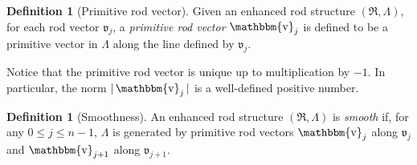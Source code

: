 \documentclass[a4paper,11pt]{amsart}
\theoremstyle{definition}
\newtheorem{definition}[theorem]{Definition}
\numberwithin{equation}{section}
\newcommand{\mv} {\mathfrak v}
\newcommand{\mR} {\mathfrak R}
\DeclareMathOperator{\bbv}{\mathbbm{v}}
\begin{document}
\begin{definition}[Primitive rod vector]
Given an enhanced rod structure $(\mR, \Lambda)$, for each rod vector $\mv_j$, a \emph{primitive rod vector} $\bbv_j$ is defined to be a primitive vector in $\Lambda$ along the line defined by $\mv_j$.
\end{definition}

Notice that the primitive rod vector is unique up to multiplication by $-1$.  In particular, the norm $|\bbv_j|$ is a well-defined positive number. 
 
 \begin{definition}[Smoothness]
	An enhanced rod structure \( (\mathfrak{R}, \Lambda) \) is \emph{smooth} if, for any \( 0 \leq j \leq n-1 \), 
    $\Lambda$ is generated by primitive rod vectors \( \bbv_j \) along $\mv_j$ and \( \bbv_{j+1} \) along $\mv_{j+1}$.
\end{definition}
\end{document}
